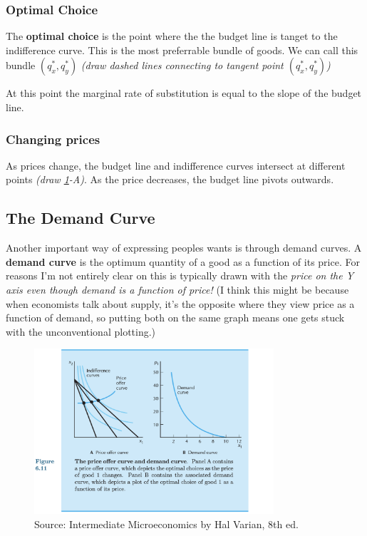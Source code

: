 \documentclass[11pt]{article}
\begin{document}
\subsubsection{Optimal Choice}

The {\bf optimal choice} is the point where the the budget line is tanget to the indifference curve. This is the most preferrable bundle of goods. We can call this bundle $(q_x^*, q_y^*)$ {\it (draw dashed lines connecting to tangent point $(q_x^*, q_y^*)$)}

At this point the marginal rate of substitution is equal to the slope of the budget line.

\subsubsection{Changing prices}

As prices change, the budget line and indifference curves intersect at different points {\it (draw \ref{fig:demand}-A)}.
As the price decreases, the budget line pivots outwards.


\subsection{The Demand Curve}

Another important way of expressing peoples wants is through demand curves. 
A {\bf demand curve} is the optimum quantity of a good as a function of its price. 
For reasons I'm not entirely clear on this is typically drawn with the {\it price on the Y axis even though demand is a function of price!}
(I think this might be because when economists talk about supply, it's the opposite where they view price as a function of demand, so putting both on the same graph means one gets stuck with the unconventional plotting.)



\begin{figure}[h]
    \centering
    \includegraphics*[width=3.5in]{demandcurve.png}
    \caption{Source: Intermediate Microeconomics by Hal Varian, 8th ed.}
    \label{fig:demand}
\end{figure}
\end{document}

